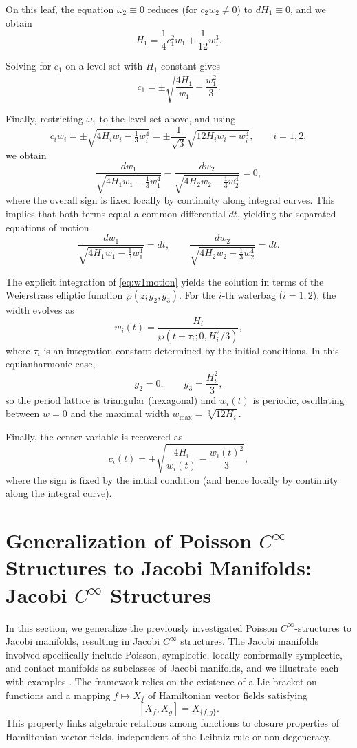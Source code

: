 \documentclass{article}
\theoremstyle{remark}
\theoremstyle{definition}
\begin{document}
On this leaf, the equation $\omega_2\equiv 0$ reduces (for $c_2w_2\neq 0$) to $dH_1\equiv 0$, and we obtain
\[
H_1=\frac14c_1^2w_1+\frac{1}{12}w_1^3.
\]

Solving for $c_1$ on a level set with $H_1$ constant gives
\begin{equation}\label{rel_c1}
c_1 = \pm\sqrt{\frac{4H_1}{w_1} - \frac{w_1^2}{3}}.
\end{equation}

Finally, restricting $\omega_1$ to the level set above, and using
\[
c_iw_i=\pm\sqrt{4H_iw_i-\tfrac13 w_i^4}=\pm\frac{1}{\sqrt{3}}\sqrt{12H_iw_i-w_i^4},\qquad i=1,2,
\]
we obtain
\[
\frac{dw_1}{\sqrt{4H_1 w_1 - \tfrac13 w_1^4}} - \frac{dw_2}{\sqrt{4H_2 w_2 - \tfrac13 w_2^4}} = 0,
\]
where the overall sign is fixed locally by continuity along integral curves.
This implies that both terms equal a common differential $dt$, yielding the separated equations of motion
\begin{equation}\label{eq:w1motion}
\frac{dw_1}{\sqrt{4H_1 w_1 - \tfrac13 w_1^4}} = dt, \qquad
\frac{dw_2}{\sqrt{4H_2 w_2 - \tfrac13 w_2^4}} = dt.
\end{equation}


The explicit integration of \eqref{eq:w1motion} yields the solution in terms of the Weierstrass elliptic function $\wp(z;g_2,g_3)$. For the $i$-th waterbag ($i=1,2$), the width evolves as
\begin{equation}\label{eq:weierstrass_sol}
    w_i(t) = \frac{H_i}{\wp(t + \tau_i; 0, H_i^2/3)},
\end{equation}
where $\tau_i$ is an integration constant determined by the initial conditions. In this equianharmonic case,
\[
g_2 = 0, \qquad g_3 = \frac{H_i^2}{3},
\]
so the period lattice is triangular (hexagonal) and $w_i(t)$ is periodic, oscillating between $w=0$ and the maximal width $w_{\max}=\sqrt[3]{12H_i}$.


Finally, the center variable is recovered as
\[
c_i(t)=\pm\sqrt{\frac{4H_i}{w_i(t)}-\frac{w_i(t)^2}{3}},
\]
where the sign is fixed by the initial condition (and hence locally by continuity along the integral curve).

\section{Generalization of Poisson \texorpdfstring{$C^\infty$}{Cinfty} Structures to Jacobi Manifolds: Jacobi \texorpdfstring{$C^\infty$}{Cinfty} Structures}\label{sec:jacobicinf}
In this section, we generalize the previously investigated Poisson $C^\infty$-structures to Jacobi manifolds, resulting in Jacobi $C^\infty$ structures. The Jacobi manifolds involved specifically include Poisson, symplectic, locally conformally symplectic, and contact manifolds as subclasses of Jacobi manifolds, and we illustrate each with examples \cite{sardon1,sardon2,sardon3}. The framework relies on the existence of a Lie bracket on functions and a mapping $f \mapsto X_f$ of Hamiltonian vector fields satisfying
\[
[X_f,X_g] = X_{\{f,g\}}.
\]
This property links algebraic relations among functions to closure properties of Hamiltonian vector fields, independent of the Leibniz rule or non-degeneracy.
\end{document}

